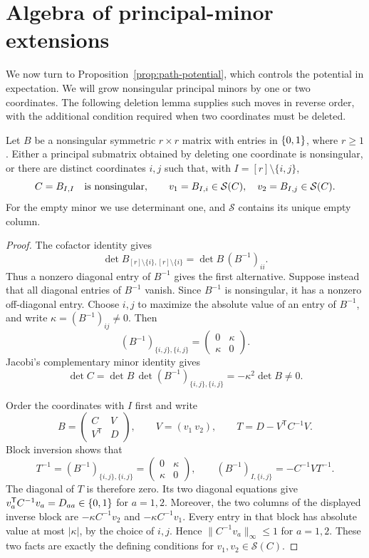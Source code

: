 \section{Algebra of principal-minor extensions}\label{sec:minor-moves}

We now turn to Proposition~\ref{prop:path-potential}, which controls the
potential in expectation. We will grow nonsingular principal minors by one
or two coordinates.
The following deletion lemma supplies such moves in reverse order, with
the additional condition required when two coordinates must be deleted.

\begin{lemma}\label{lem:gated-deletion}
Let \(B\) be a nonsingular symmetric \(r\times r\) matrix with entries
in \(\{0,1\}\), where \(r\ge1\). Either a principal submatrix obtained by
deleting one coordinate is nonsingular, or there are distinct coordinates
\(i,j\) such that, with \(I=[r]\setminus\{i,j\}\),
\[
 C=B_{I,I}\quad\hbox{is nonsingular},\qquad
 v_1=B_{I,i}\in\mathcal S(C),\quad v_2=B_{I,j}\in\mathcal S(C).
\]
For the empty minor we use determinant one, and \(\mathcal S\) contains
its unique empty column.
\end{lemma}

\begin{proof}
The cofactor identity gives
\[
 \det B_{[r]\setminus\{i\},[r]\setminus\{i\}}
   =\det B\,(B^{-1})_{ii}.
\]
Thus a nonzero diagonal entry of \(B^{-1}\) gives the first alternative.
Suppose instead that all diagonal entries of \(B^{-1}\) vanish. Since
\(B^{-1}\) is nonsingular, it has a nonzero off-diagonal entry. Choose
\(i,j\) to maximize the absolute value of an entry of \(B^{-1}\), and
write \(\kappa=(B^{-1})_{ij}\ne0\). Then
\[
 (B^{-1})_{\{i,j\},\{i,j\}}=
 \begin{pmatrix}0&\kappa\\ \kappa&0\end{pmatrix}.
\]
Jacobi's complementary minor identity gives
\[
 \det C=\det B\,
          \det (B^{-1})_{\{i,j\},\{i,j\}}
        =-\kappa^2\det B\ne0.
\]

Order the coordinates with \(I\) first and write
\[
 B=\begin{pmatrix}C&V\\ V^{\mathsf T}&D\end{pmatrix},
 \qquad V=(v_1\ v_2),\qquad
 T=D-V^{\mathsf T}C^{-1}V.
\]
Block inversion shows that
\[
 T^{-1}=(B^{-1})_{\{i,j\},\{i,j\}}
       =\begin{pmatrix}0&\kappa\\ \kappa&0\end{pmatrix},
 \qquad
 (B^{-1})_{I,\{i,j\}}=-C^{-1}VT^{-1}.
\]
The diagonal of \(T\) is therefore zero. Its two diagonal equations give
\(v_a^{\mathsf T}C^{-1}v_a=D_{aa}\in\{0,1\}\) for \(a=1,2\). Moreover,
the two columns of the displayed inverse block are
\(-\kappa C^{-1}v_2\) and \(-\kappa C^{-1}v_1\). Every entry in that
block has absolute value at most \(|\kappa|\), by the choice of \(i,j\).
Hence \(\|C^{-1}v_a\|_\infty\le1\) for \(a=1,2\). These two facts are
exactly the defining conditions for \(v_1,v_2\in\mathcal S(C)\).
\end{proof}

